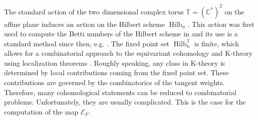 \documentclass[12pt,a4paper]{amsart}
\theoremstyle{plain}
\theoremstyle{definition}
\theoremstyle{remark}
\newcommand{\Hilb}[1]{\operatorname{Hilb}_{{#1}}}
\newcommand{\CC}{\mathbb{C}}
\newcommand{\TT}{\mathbb{T}}
\newcommand{\E}{\mathcal{E}}
\begin{document}
The standard action of the two dimensional complex torus $\TT=(\CC^*)^2$ on the affine plane induces an action on the Hilbert scheme $\Hilb{n}$. This action was first used to compute the Betti numbers of the Hilbert scheme in \cite{ESBBdec} and its use is a standard method since then, e.g. \cite{Evain2,Smirnov,KZ,SV}. 
The fixed point set $\Hilb{n}^\TT$ is finite, which allows for a combinatorial approach to the equivariant cohomology and K-theory using localization theorems \cite{Tho,AB}. Roughly speaking, any class in K-theory is determined by local contributions coming from the fixed point set. These contributions are governed by the combinatorics of the tangent weights. Therefore, many cohomological statements can be reduced to combinatorial problems. Unfortunately, they are usually complicated. This is the case for the computation of the map $\E_F$.
\\ 
\end{document}
